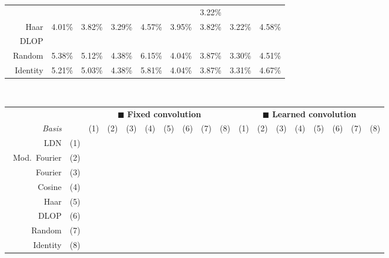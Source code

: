 \begin{table}[p]
\begin{tabular}{r  r r r r  r r r r}
	 \cellcolor{CornflowerBlue!25}{3.96\%} &
	 \cellcolor{CornflowerBlue!50}{3.64\%} &
	 \cellcolor{CornflowerBlue!25}{3.25\%} &
	 \cellcolor{CornflowerBlue!50}{4.26\%} &
	 \cellcolor{CornflowerBlue!75}{3.80\%} &
	 \cellcolor{CornflowerBlue!75}{3.59\%} &
	3.22\% &
	 \cellcolor{CornflowerBlue!50}{4.33\%} \\
	\symSDT~Haar &
	4.01\% &
	3.82\% &
	3.29\% &
	4.57\% &
	3.95\% &
	3.82\% &
	3.22\% &
	4.58\% \\
	\symFIR~DLOP &
	 \cellcolor{CornflowerBlue!50}{3.90\%} &
	 \cellcolor{CornflowerBlue!25}{3.75\%} &
	 \cellcolor{CornflowerBlue!50}{3.17\%} &
	 \cellcolor{CornflowerBlue!25}{4.42\%} &
	 \cellcolor{CornflowerBlue!25}{3.86\%} &
	 \cellcolor{CornflowerBlue!25}{3.65\%} &
	 \cellcolor{CornflowerBlue!25}{3.16\%} &
	 \cellcolor{CornflowerBlue!75}{4.32\%} \\
	\symFIR~Random &
	5.38\% &
	5.12\% &
	4.38\% &
	6.15\% &
	4.04\% &
	3.87\% &
	3.30\% &
	4.51\% \\
	\symFIR~Identity &
	5.21\% &
	5.03\% &
	4.38\% &
	5.81\% &
	4.04\% &
	3.87\% &
	3.31\% &
	4.67\% \\
	\bottomrule
	\end{tabular}\\[10pt]
	\centering\small\sffamily
	\setlength{\tabcolsep}{4.75pt}
	\begin{tabular}{r r  c c c c c c c c  c c c c c c c c}
	\toprule
	& & \multicolumn{8}{c}{{\color{skyblue1}$\blacksquare$} \textbf{Fixed convolution}}
	& \multicolumn{8}{c}{{\color{aluminium2}$\blacksquare$} \textbf{Learned convolution}} \\
	\cmidrule(r){3-10}\cmidrule(l){11-18}
	\emph{Basis} & & (1) & (2) & (3) & (4) & (5) & (6) & (7) & (8)  & (1) & (2) & (3) & (4) & (5) & (6) & (7) & (8) \\
	\midrule
	\symLTI~LDN & (1) &
	 &
	\sigC &
	\sigC &
	 &
	\sigB &
	\sigA &
	\sigC &
	\sigC &
	 &
	 &
	 &
	 &
	 &
	 &
	 &
	 \\
	\symLTI~Mod.~Fourier & (2) &
	\sigC &
	 &
	 &
	\sigB &
	 &
	\sigA &
	\sigC &
	\sigC &
	 &
	 &
	 &
	 &
	 &
	 &
	 &
	 \\
	\symSDT~Fourier & (3) &
	\sigC &
	 &
	 &
	 &
	 &
	 &
	\sigC &
	\sigC &
	 &
	 &
	 &
	 &
	 &
	 &
	 &
	 \\
	\symSDT~Cosine & (4) &
	 &
	\sigB &
	 &
	 &
	 &
	 &
	\sigC &
	\sigC &
	 &
	 &
	 &
	 &
	 &
	 &
	 &
	 \\
	\symSDT~Haar & (5) &
	\sigB &
	 &
	 &
	 &
	 &
	 &
	\sigC &
	\sigC &
	 &
	 &
	 &
	 &
	 &
	 &
	 &
	 \\
	\symFIR~DLOP & (6) &
	\sigA &
	\sigA &
	 &
	 &
	 &
	 &
	\sigC &
	\sigC &
	 &
	 &
	 &
	 &
	 &
	 &
	 &
	 \\
	\symFIR~Random & (7) &
	\sigC &
	\sigC &
	\sigC &
	\sigC &
	\sigC &
	\sigC &
	 &
	 &
	 &
	 &
	 &
	 &
	 &
	 &
	 &
	 \\
	\symFIR~Identity & (8) &
	\sigC &
	\sigC &
	\sigC &
	\sigC &
	\sigC &
	\sigC &
	 &
	 &
	 &
	 &
	 &
	 &
	 &
	 &
	 &
	 \\
	\bottomrule
	\end{tabular}
\end{table}

